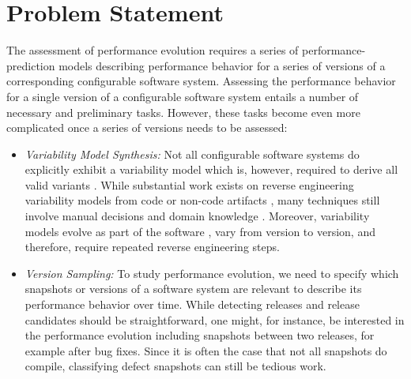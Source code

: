 \section{Problem Statement}
The assessment of performance evolution requires a series of
performance-prediction models describing performance behavior for a series of
versions of a corresponding configurable software system. Assessing the
performance behavior for a single version of a configurable software system entails a number of
necessary and preliminary tasks. However, these tasks become even more
complicated once a series of versions needs to be assessed:
\begin{itemize}

  \item \emph{Variability Model Synthesis:} Not all configurable software
  systems do explicitly exhibit a variability model which is, however, required to derive
  all valid variants \citep{rabkin_static_2011,nadi_where_2015}.
	While substantial work exists on reverse engineering variability models from
	code
	\citep{rabkin_static_2011,she_reverse_2011,zhou_extracting_2015,nadi_where_2015}
	 or non-code artifacts
	\citep{alves_exploratory_2008,andersen_efficient_2012,bakar_feature_2015}, many
	techniques still involve manual decisions \citep{she_reverse_2011} and domain
	knowledge \citep{nadi_where_2015}.
	Moreover, variability models evolve as part of the software
	\citep{peng_analyzing_2011}, vary from version to version, and therefore,
	require repeated reverse engineering steps.
	


\item \emph{Version Sampling:} To study performance evolution, we need to
specify which snapshots or versions of a software system are relevant to
describe its performance behavior over time. While detecting releases and release candidates should be straightforward, one might, for instance, be interested in the performance evolution including snapshots
between two releases, for example after bug fixes. Since it is  often the case
that not all snapshots do compile, classifying defect snapshots can still be tedious work.


\end{itemize}
